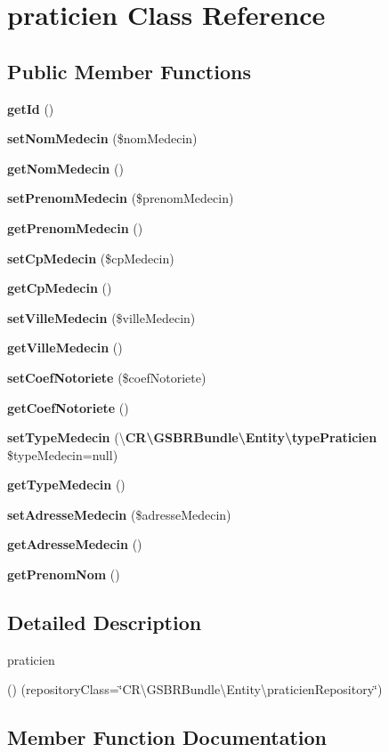 \section{praticien Class Reference}
\label{class_c_r_1_1_g_s_b_r_bundle_1_1_entity_1_1praticien}
\subsection*{Public Member Functions}
\begin{DoxyCompactItemize}
\item 
{\bf get\+Id} ()
\item 
{\bf set\+Nom\+Medecin} (\$nom\+Medecin)
\item 
{\bf get\+Nom\+Medecin} ()
\item 
{\bf set\+Prenom\+Medecin} (\$prenom\+Medecin)
\item 
{\bf get\+Prenom\+Medecin} ()
\item 
{\bf set\+Cp\+Medecin} (\$cp\+Medecin)
\item 
{\bf get\+Cp\+Medecin} ()
\item 
{\bf set\+Ville\+Medecin} (\$ville\+Medecin)
\item 
{\bf get\+Ville\+Medecin} ()
\item 
{\bf set\+Coef\+Notoriete} (\$coef\+Notoriete)
\item 
{\bf get\+Coef\+Notoriete} ()
\item 
{\bf set\+Type\+Medecin} (\textbackslash{}{\bf C\+R\textbackslash{}\+G\+S\+B\+R\+Bundle\textbackslash{}\+Entity\textbackslash{}type\+Praticien} \$type\+Medecin=null)
\item 
{\bf get\+Type\+Medecin} ()
\item 
{\bf set\+Adresse\+Medecin} (\$adresse\+Medecin)
\item 
{\bf get\+Adresse\+Medecin} ()
\item 
{\bf get\+Prenom\+Nom} ()
\end{DoxyCompactItemize}


\subsection{Detailed Description}
praticien

() (repository\+Class=\char`\"{}\+C\+R\textbackslash{}\+G\+S\+B\+R\+Bundle\textbackslash{}\+Entity\textbackslash{}praticien\+Repository\char`\"{}) 

\subsection{Member Function Documentation}
